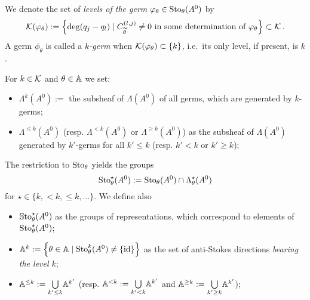 \begin{defn}
  We denote the set of \emph{levels of the germ}
  $\varphi_{\theta}\in\operatorname{Sto}_\theta(A^0)$ by
  \[
    \mathcal{K}(\varphi_\theta):= \left\{\deg(q_j-q_l)\mid C_{\widetilde\theta}^{(l,j)}\neq0
      \text{ in some determination of }\varphi_\theta\right\} \subset \mathcal{K} \,.
  \]
  A germ $\phi_\theta$ is called a \emph{$k$-germ} when
  $\mathcal{K}(\varphi_{\theta})\subset\{k\}$, i.e.\ its only level, if present, is $k$.
\end{defn}
\begin{notations}
  For $k\in\mathcal{K}$ and $\theta\in\mathbb{A}$ we set:
  \begin{itemize}
    \item $\Lambda^{k}(A^0):=$ the subsheaf of $\Lambda(A^0)$ of all germs,
      which are generated by $k$-germs;
    \item $\Lambda^{\leq k}(A^0)$ (resp. $\Lambda^{<k}(A^0)$ or
      $\Lambda^{\geq k}(A^0)$) as the subsheaf of $\Lambda(A^0)$ generated by
      $k'$-germs for all $k'\leq k$ (resp. $k'<k$ or $k'\geq k$);
  \end{itemize}
  The restriction to $\operatorname{Sto}_\theta$ yields the groups
  \[
    \operatorname{Sto}_\theta^\star(A^0):=\operatorname{Sto}_\theta(A^0)\cap\Lambda_\theta^{\star}(A^0)
  \]
  for $\star\in\{k,<k,\leq k,\dots\}$.
  We define also
  \begin{itemize}
    \item $\operatorname{\mathbb{S}to}^\star_\theta(A^0)$ as the groups of representations, which
      correspond to elements of  $\operatorname{Sto}^\star_\theta(A^0)$;
    \item $\mathbb{A}^k:=\left\{\theta\in\mathbb{A}\mid\operatorname{Sto}_\theta^k(A^0)\neq\{\operatorname{id}\}\right\}$
      as the set of anti-Stokes directions \emph{bearing the level $k$};
    \item $\mathbb{A}^{\leq k}:=\underset{k'\leq k}\bigcup\mathbb{A}^{k'}$ (resp.
      $\mathbb{A}^{<k}:=\underset{k'<k}\bigcup\mathbb{A}^{k'}$ and
      $\mathbb{A}^{\geq k}:=\underset{k'\geq k}\bigcup\mathbb{A}^{k'}$);
      \begin{s-rem}

\end{s-rem}
\end{itemize}
\end{notations}
